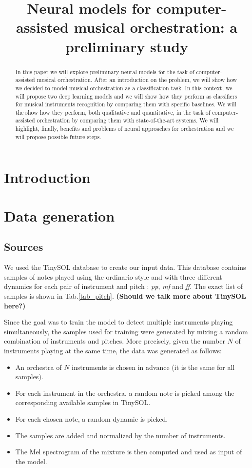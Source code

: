 \documentclass{article}
\title{Neural models for computer-assisted musical orchestration: a preliminary study}
\begin{document}
%
\maketitle
%
\begin{abstract}
In this paper we will explore preliminary neural models for the task of computer-assisted musical orchestration. After an introduction on the problem, we will show how we decided to model musical orchestration as a classification task. In this context, we will propose two deep learning models and we will show how they perform as classifiers for musical instruments recognition by comparing them with specific baselines. We will the show how they perform, both qualitative and quantitative, in the task of computer-assisted orchestration by comparing them with state-of-the-art systems. We will highlight, finally, benefits and problems of neural approaches for orchestration and we will propose possible future steps.
\end{abstract}
%
\section{Introduction}\label{sec:introduction}

\section{Data generation}

\subsection{Sources}
We used the TinySOL database to create our input data. This database contains samples of notes played using the ordinario style and with three different dynamics for each pair of instrument and pitch : \textit{pp}, \textit{mf} and \textit{ff}. The exact list of samples is shown in Tab.\ref{tab_pitch}.  \textbf{(Should we talk more about TinySOL here?)}

Since the goal was to train the model to detect multiple instruments playing simultaneously, the samples used for training were generated by mixing a random combination of instruments and pitches. More precisely, given the number $N$ of instruments playing at the same time, the data was generated as follows:

\begin{itemize}
\item An orchestra of $N$ instruments is chosen in advance (it is the same for all samples).
\item For each instrument in the orchestra, a random note is picked among the corresponding available samples in TinySOL.
\item For each chosen note, a random dynamic is picked.
\item The samples are added and normalized by the number of instruments.
\item The Mel spectrogram of the mixture is then computed and used as input of the model.
\end{itemize}
\end{document}
